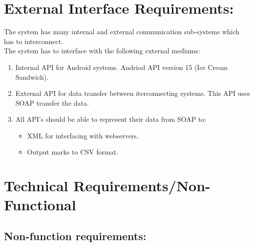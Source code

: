 \documentclass[12pt]{article}
\begin{document}
		
	\vspace{0.5in}
	
	\section{External Interface Requirements:}
	\vspace{0.2in}
	
	The system has many internal and external communication 
	sub-systems which has to interconnect. 
	\\
	The system has to interface with the following external mediums:
	\begin{enumerate}
	\item Internal API for Android systems. Andriod API version 15 (Ice Cream Sandwich). 
	\item   External API for data transfer between iterconnecting systems. 
			This API uses SOAP transfer the data.
	\item	All API's should be able to represent their data from SOAP to:
				\begin{itemize}
					\item XML for interfacing with webservers.
					\item Output marks to CSV format.					
				\end{itemize} 
					
	\end{enumerate}
	
	\vspace{0.5in}
	
	\section{Technical Requirements/Non-Functional}
	\vspace{0.2in}
	
		\subsection{Non-function requirements:}%
		\vspace{0.1in}
		
\end{document}
